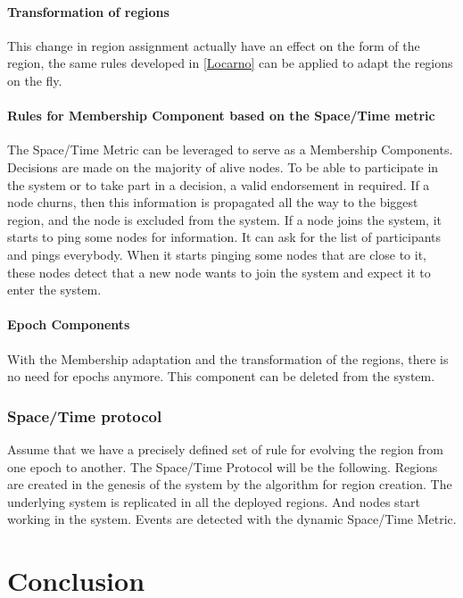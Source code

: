 \documentclass[a4paper,11pt,oneside]{report}
\begin{document}
\subsubsection{Transformation of regions}
This change in region assignment actually have an effect on the form of the
region, the same rules developed in \ref{Locarno} can be applied to adapt the
regions on the fly. 

\subsubsection{Rules for Membership Component based on the Space/Time metric}
The Space/Time Metric can be leveraged to serve as a Membership Components.
Decisions are made on the majority of alive nodes. To be able to participate in
the system or to take part in a decision, a valid endorsement in required. If a
node churns, then this information is propagated all the way to the
biggest region, and the node is excluded from the system.  If a node joins the
system, it starts to ping some nodes for information. It can ask for the list
of participants and pings everybody. When it starts pinging some nodes that are
close to it, these nodes detect that a new node wants to join the system and
expect it to enter the system.  

\subsubsection{Epoch Components}
With the Membership adaptation and the transformation of the regions, there is
no need for epochs anymore. This component can be deleted from the system. 


\subsection{Space/Time protocol}
Assume that we have a precisely defined set of rule for evolving the region from one epoch to another. 
The Space/Time Protocol will be the following. Regions are created in the genesis of the system by the algorithm for region creation. The underlying system is replicated in all the deployed regions. And nodes start working in the system. Events are detected with the dynamic Space/Time Metric. 



\chapter{Conclusion}
\end{document}
